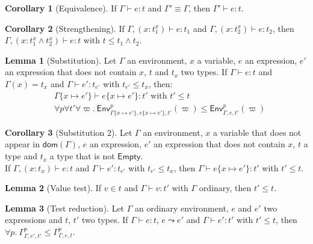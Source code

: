 \documentclass[a4paper]{article}%
\newcommand{\dom}[1]{\textsf{dom}(#1)}
\newcommand{\Empty} {\textsf{Empty}}%
\newcommand{\subst}[2]{\{#1 \mapsto #2\}}
\newcommand{\Gp}[2]{\textsf{Env}^{#1}_{#2}}
\theoremstyle{definition}
\newtheorem{lemma}{Lemma}
\newtheorem{corollary}{Corollary}
\begin{document}
    \begin{corollary}[Equivalence]
      If $\Gamma \vdash e:t$ and $\Gamma' \equiv \Gamma$, then $\Gamma' \vdash e:t$.
    \end{corollary}

    \begin{corollary}[Strengthening]
      If $\Gamma, (x:t_1^x) \vdash e:t_1$ and $\Gamma, (x:t_2^x) \vdash e:t_2$, then
      $\Gamma, (x:t_1^x\land t_2^x) \vdash e:t$ with $t \leq t_1\land t_2$.
    \end{corollary}

    \begin{lemma}[Substitution]
      Let $\Gamma$ an environment, $x$ a variable, $e$ an expression, $e'$ an expression that does not contain $x$, $t$ and $t_x$ two types.
      If $\Gamma \vdash e:t$ and $\Gamma(x) = t_x$ and $\Gamma \vdash e':t_{e'}$ with $t_{e'} \leq t_x$, then:
      \begin{align*}
        &\Gamma \subst x {e'} \vdash e \subst x {e'}:t' \text{ with } t'\leq t\\
        &\forall p \forall t' \forall \varpi.\ \Gp p {\Gamma\subst x {e'},e\subst x {e'},t'} (\varpi) \leq \Gp p {\Gamma,e,t'} (\varpi)
      \end{align*}
    \end{lemma}

    \begin{corollary}[Substitution 2]
      Let $\Gamma$ an environment, $x$ a variable that does not appear in $\dom \Gamma$, $e$ an expression, $e'$ an expression that does not contain $x$, $t$ a type and $t_x$ a type that is not $\Empty$.\\
      If $\Gamma, (x:t_x) \vdash e:t$ and $\Gamma \vdash e':t_{e'}$ with $t_{e'} \leq t_x$, then $\Gamma \vdash e \subst x {e'}:t'$ with $t'\leq t$.
    \end{corollary}

    \begin{lemma}[Value test]
      If $v \in t$ and $\Gamma \vdash v : t'$ with $\Gamma$ ordinary, then $t' \leq t$.
    \end{lemma}

    \begin{lemma}[Test reduction]
      Let $\Gamma$ an ordinary environment, $e$ and $e'$ two expressions and $t$, $t'$ two types.
      If $\Gamma \vdash e : t$, $e \leadsto e'$ and $\Gamma \vdash e' : t'$ with $t'\leq t$,
      then $\forall p.\ \Gamma^p_{\Gamma,e',t'} \leq \Gamma^p_{\Gamma,e,t}$.
    \end{lemma}
\end{document}
